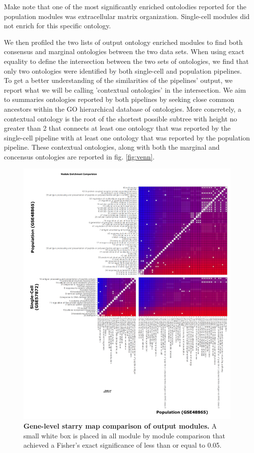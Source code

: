 \documentclass[10pt,letterpaper]{article}
\begin{document}
Make note that one of the most significantly enriched ontolodies reported for the population modules was extracellular matrix organization. Single-cell modules did not enrich for this specific ontology. 

We then profiled the two lists of output ontology enriched modules to find both consensus and marginal ontologies between the two data sets. When using exact equality to define the intersection between the two sets of ontologies, we find that only two ontologies were identified by both single-cell and population pipelines. To get a better understanding of the similarities of the pipelines' output, we report what we will be calling 'contextual ontologies' in the intersection. We aim to summaries ontologies reported by both pipelines by seeking close common ancestors within the GO hierarchical database of ontologies. More concretely, a contextual ontology is the root of the shortest possible subtree with height no greater than 2 that connects at least one ontology that was reported by the single-cell pipeline with at least one ontology that was reported by the population pipeline. These contextual ontologies, along with both the marginal and concensus ontologies are reported in fig. \ref{fig:venn}.


\begin{figure}[h]
\centering
\includegraphics[width=120mm]{Figures/moduleCompareStaryMap}
\caption{\textbf{Gene-level starry map comparison of output modules.} A small white box is placed in all module by module comparison that achieved a Fisher's exact significance of less than or equal to 0.05.}
\label{fig:starryMap2}
\end{figure}
\end{document}
